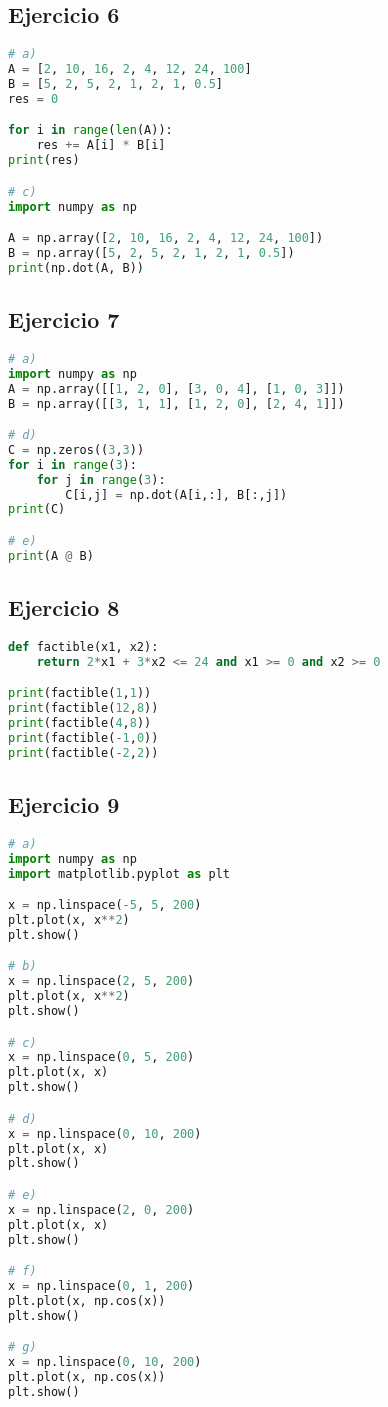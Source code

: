 \documentclass[12pt]{article}
\begin{document}
\subsection{Ejercicio 6}
\begin{lstlisting}[language=Python]
# a)
A = [2, 10, 16, 2, 4, 12, 24, 100]
B = [5, 2, 5, 2, 1, 2, 1, 0.5]
res = 0

for i in range(len(A)):
    res += A[i] * B[i]
print(res)

# c)
import numpy as np

A = np.array([2, 10, 16, 2, 4, 12, 24, 100])
B = np.array([5, 2, 5, 2, 1, 2, 1, 0.5])
print(np.dot(A, B))
\end{lstlisting}

\subsection{Ejercicio 7}
\begin{lstlisting}[language=Python]
# a)
import numpy as np
A = np.array([[1, 2, 0], [3, 0, 4], [1, 0, 3]])
B = np.array([[3, 1, 1], [1, 2, 0], [2, 4, 1]])

# d)
C = np.zeros((3,3))
for i in range(3):
    for j in range(3):
        C[i,j] = np.dot(A[i,:], B[:,j])
print(C)

# e)
print(A @ B)
\end{lstlisting}

\subsection{Ejercicio 8}
\begin{lstlisting}[language=Python]
def factible(x1, x2):
    return 2*x1 + 3*x2 <= 24 and x1 >= 0 and x2 >= 0

print(factible(1,1))
print(factible(12,8))
print(factible(4,8))
print(factible(-1,0))
print(factible(-2,2))
\end{lstlisting}

\subsection{Ejercicio 9}
\begin{lstlisting}[language=Python]
# a)
import numpy as np
import matplotlib.pyplot as plt

x = np.linspace(-5, 5, 200)
plt.plot(x, x**2)
plt.show()

# b)
x = np.linspace(2, 5, 200)
plt.plot(x, x**2)
plt.show()

# c)
x = np.linspace(0, 5, 200)
plt.plot(x, x)
plt.show()

# d)
x = np.linspace(0, 10, 200)
plt.plot(x, x)
plt.show()

# e)
x = np.linspace(2, 0, 200)
plt.plot(x, x)
plt.show()

# f)
x = np.linspace(0, 1, 200)
plt.plot(x, np.cos(x))
plt.show()

# g)
x = np.linspace(0, 10, 200)
plt.plot(x, np.cos(x))
plt.show()
\end{lstlisting}
\end{document}
